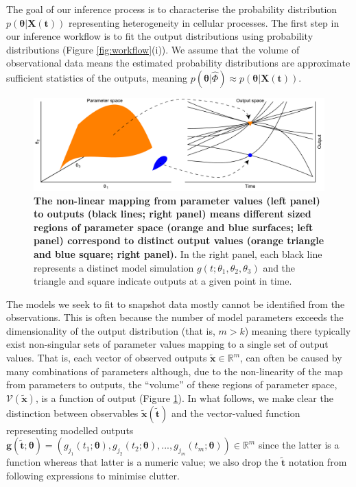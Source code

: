 \documentclass[10pt,letterpaper]{article}
\begin{document}
The goal of our inference process is to  characterise the probability distribution $p(\boldsymbol{\theta}|\boldsymbol{X}(\boldsymbol{t}))$ representing heterogeneity in cellular processes. The first step in our inference workflow is to fit the output distributions using probability distributions (Figure \ref{fig:workflow}(i)). We assume that the volume of observational data means the estimated probability distributions are approximate sufficient statistics of the outputs, meaning $p(\boldsymbol{\theta}|\hat{\Phi}) \approx p(\boldsymbol{\theta}|\boldsymbol{X}(\boldsymbol{t}))$.

\begin{figure}[H]
	\centerline{\includegraphics[width=\textwidth]{../figures/contour_volumes.pdf}}
	\caption{\textbf{The non-linear mapping from parameter values (left panel) to outputs (black lines; right panel) means different sized regions of parameter space (orange and blue surfaces; left panel) correspond to distinct output values (orange triangle and blue square; right panel).} In the right panel, each black line represents a distinct model simulation $g(t; \theta_1, \theta_2, \theta_3)$ and the triangle and square indicate outputs at a given point in time.}
	\label{fig:contour_volumes}
\end{figure}


The models we seek to fit to snapshot data mostly cannot be identified from the observations. This is often because the number of model parameters exceeds the dimensionality of the output distribution (that is, $m>k$) meaning there typically exist non-singular sets of parameter values mapping to a single set of output values. That is, each vector of observed outputs $\tilde{\boldsymbol{x}}\in\mathbb{R}^m$, can often be caused by many combinations of parameters although, due to the non-linearity of the map from parameters to outputs, the ``volume'' of these regions of parameter space, $\mathcal{V}(\tilde{\boldsymbol{x}})$, is a function of output (Figure \ref{fig:contour_volumes}). In what follows, we make clear the distinction between observables $\tilde{\boldsymbol{x}}(\tilde{\boldsymbol{t}})$ and the vector-valued function representing modelled outputs $\boldsymbol{g}(\tilde{\boldsymbol{t}}; \boldsymbol{\theta})=(g_{j_1}(t_1; \boldsymbol{\theta}),g_{j_2}(t_2; \boldsymbol{\theta}),...,g_{j_m}(t_m; \boldsymbol{\theta}))\in\mathbb{R}^m$ since the latter is a function whereas that latter is a numeric value; we also drop the $\tilde{\boldsymbol{t}}$ notation from following expressions to minimise clutter.
\end{document}
